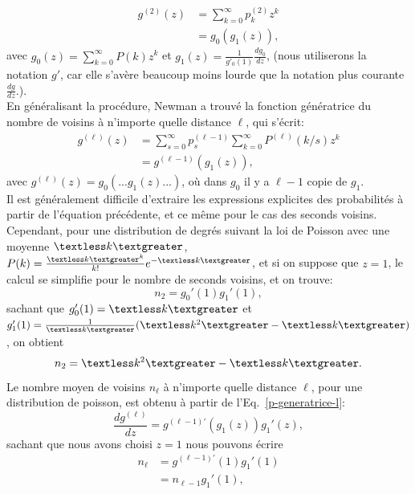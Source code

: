 \begin{align}
	g^{(2)}(z)&=\sum_{k=0}^{\infty}p_k^{(2)}z^{k}\nonumber\\
	&=g_0(g_1(z)),
	\label{p-generatrice-2}
\end{align}
avec $g_0(z)=\sum_{k=0}^{\infty}P(k)z^k$ et $g_1(z)=\frac{1}{g'_0(1)}\frac{dg_0}{dz}$, (nous utiliserons la notation $g'$, car elle s'avère beaucoup moins lourde que la notation plus courante $\frac{dg}{dz}$.).\\
En généralisant la procédure, Newman a trouvé la fonction génératrice du nombre de voisins à n'importe quelle distance $\ell$, qui s'écrit:
\begin{align}
g^{(\ell)}(z)&=\sum_{s=0}^{\infty}p_s^{(\ell-1)}\sum_{k=0}^{\infty}P^{(\ell)}(k/s)z^k\\
&=g^{(\ell-1)}(g_1(z)),
\label{p-generatrice-l}
\end{align}
avec $g^{(\ell)}(z)=g_0(...g_1(z)...)$, où dans $g_0$ il y a $\ell-1$ copie de $g_1$.\\
Il est généralement difficile d'extraire les expressions explicites des probabilités à partir de l'équation précédente, et ce m\^{e}me pour le cas des seconds voisins. Cependant, pour une distribution de degrés suivant la loi de Poisson avec une moyenne $\km$, $P(k)=\frac{\km^k}{k!}e^{-\km}$, et si on suppose que $z=1$, le calcul se simplifie pour le nombre de seconds voisins, et on trouve:
\begin{equation}
n_2=g_0'(1)g_1'(1),
\label{3-27}
\end{equation}
sachant que $g_0'(1)=\km$ et $g_1'(1)=\frac{1}{\km}(\textless k^2\textgreater-\km)$, on obtient
\begin{equation}
n_2=\textless k^2\textgreater-\km.
\end{equation}
Le nombre moyen de voisins $n_{\ell}$ à n'importe quelle distance $\ell$, pour une distribution de poisson, est obtenu à partir de l'Eq.~\eqref{p-generatrice-l}:
\begin{equation}
\frac{dg^{(\ell)}}{dz}=g^{(\ell-1)'}(g_1(z))g_1'(z),
\end{equation}
sachant que nous avons choisi $z=1$ nous pouvons écrire 
\begin{align}
n_{\ell}&=g^{(\ell-1)'}(1)g_1'(1)\\
&=n_{\ell-1}g_1'(1),\nonumber
\end{align}
